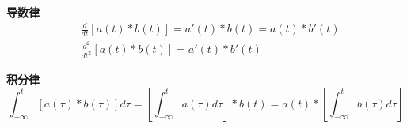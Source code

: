 {\bf 导数律}
\begin{align*}
&\frac{d}{dt}\left[ a\left( t \right) \ast b\left( t \right) \right] =a'\left( t \right) \ast b\left( t \right) =a\left( t \right) \ast b'\left( t \right) \\
&\frac{d^2}{dt^2}\left[ a\left( t \right) \ast b\left( t \right) \right] =a'\left( t \right) \ast b'\left( t \right)
\end{align*}

{\bf 积分律}
\[
\int_{-\infty}^t{\left[ a\left( \tau \right) \ast b\left( \tau \right) \right] d\tau}=\left[ \int_{-\infty}^t{a\left( \tau \right) d\tau} \right] \ast b\left( t \right) =a\left( t \right) \ast \left[ \int_{-\infty}^t{b\left( \tau \right) d\tau} \right]
\]




